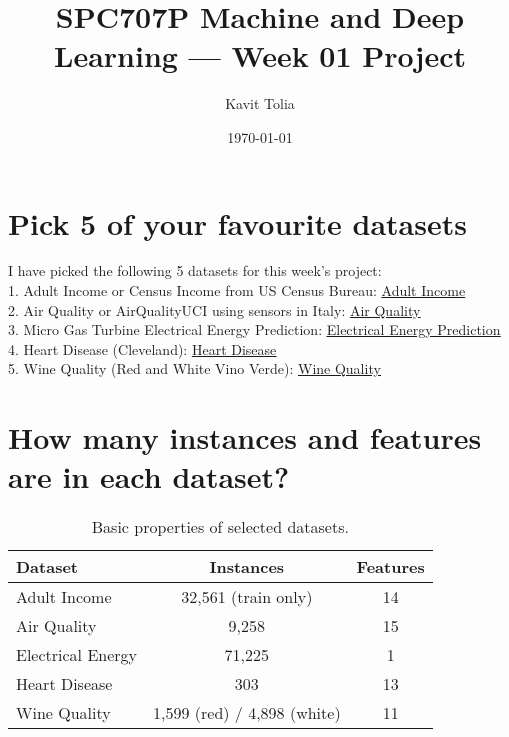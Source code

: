 \documentclass[11pt]{article}
\title{SPC707P Machine and Deep Learning — Week 01 Project}
\author{Kavit Tolia}
\date{\today}
\begin{document}
\maketitle

\pagestyle{fancy}
\fancyhf{}%


\section{Pick 5 of your favourite datasets}
I have picked the following 5 datasets for this week's project: \\
1. Adult Income or Census Income from US Census Bureau: \href{https://archive.ics.uci.edu/dataset/2/adult}{\underline{Adult Income}} \\
2. Air Quality or AirQualityUCI using sensors in Italy: \href{https://archive.ics.uci.edu/dataset/360/air+quality}{\underline{Air Quality}} \\
3. Micro Gas Turbine Electrical Energy Prediction: \href{https://archive.ics.uci.edu/dataset/994/micro+gas+turbine+electrical+energy+prediction}{\underline{Electrical Energy Prediction}} \\
4. Heart Disease (Cleveland): \href{https://archive.ics.uci.edu/dataset/45/heart+disease}{\underline{Heart Disease}} \\
5. Wine Quality (Red and White Vino Verde): \href{https://archive.ics.uci.edu/dataset/186/wine+quality}{\underline{Wine Quality}} 

\section{How many instances and features are in each dataset?}
\begin{table}[h!]
\centering
\begin{tabular}{lcc}
\hline
Dataset & Instances & Features \\
\hline
Adult Income & 32,561 (train only) & 14 \\
Air Quality & 9,258 & 15 \\
Electrical Energy & 71,225 & 1 \\
Heart Disease & 303 & 13 \\
Wine Quality & 1,599 (red) / 4,898 (white) & 11 \\
\hline
\end{tabular}
\caption{Basic properties of selected datasets.}
\end{table}
\end{document}
